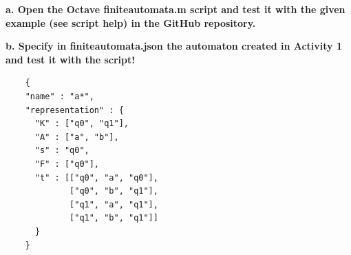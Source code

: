\documentclass{article}
\begin{document}
\vspace{4mm}

\textbf{a. Open the Octave finiteautomata.m script and test it with the given
example (see script help) in the GitHub repository.}

\vspace{4mm}

\textbf{b. Specify in finiteautomata.json the automaton created in Activity 1
and test it with the script!}

\vspace{4mm}

\begin{verbatim}
    {
    "name" : "a*",
    "representation" : {
      "K" : ["q0", "q1"],
      "A" : ["a", "b"],
      "s" : "q0",
      "F" : ["q0"],
      "t" : [["q0", "a", "q0"],
             ["q0", "b", "q1"],
             ["q1", "a", "q1"],
             ["q1", "b", "q1"]]
      }
    }
\end{verbatim}
\end{document}
